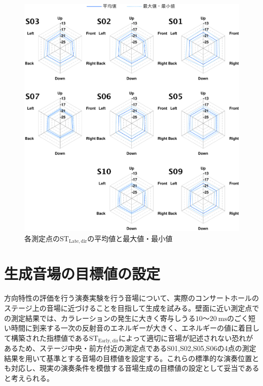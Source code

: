 \documentclass[11pt,a4j]{jreport}
\begin{document}
\newpage
{}
\begin{figure}[htbp]
  \centering
  \includegraphics[scale=.8]{images/realHallDirSt/realHallOverall/eachPointLate.pdf}
  \caption{各測定点の$\mathrm{ST_{Late,dir}}$の平均値と最大値・最小値}
  \label{fig:各測定位置のSTLateの平均値と最大値・最小値}
\end{figure}

\newpage
\section{生成音場の目標値の設定}
方向特性の評価を行う演奏実験を行う音場について、実際のコンサートホールのステージ上の音場に近づけることを目指して生成を試みる。壁面に近い測定点での測定結果では、カラレーションの発生に大きく寄与しうる$10$～$\SI{20}{\ms}$のごく短い時間に到来する一次の反射音のエネルギーが大きく、エネルギーの値に着目して構築された指標値である$\mathrm{ST_{Early,dir}}$によって適切に音場が記述されない恐れがあるため、ステージ中央・前方付近の測定点であるS01,S02,S05,S06の4点の測定結果を用いて基準とする音場の目標値を設定する。これらの標準的な演奏位置とも対応し、現実の演奏条件を模倣する音場生成の目標値の設定として妥当であると考えられる。
\end{document}
